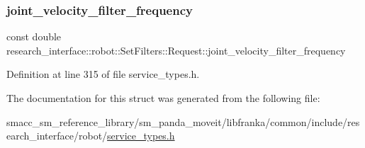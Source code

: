 \mbox{\label{structresearch__interface_1_1robot_1_1SetFilters_1_1Request_a5da8f47649157c38440941e8a55eb263}} 
\subsubsection{\texorpdfstring{joint\+\_\+velocity\+\_\+filter\+\_\+frequency}{joint\_velocity\_filter\_frequency}}
{\footnotesize\ttfamily const double research\+\_\+interface\+::robot\+::\+Set\+Filters\+::\+Request\+::joint\+\_\+velocity\+\_\+filter\+\_\+frequency}



Definition at line 315 of file service\+\_\+types.\+h.



The documentation for this struct was generated from the following file\+:\begin{DoxyCompactItemize}
\item 
smacc\+\_\+sm\+\_\+reference\+\_\+library/sm\+\_\+panda\+\_\+moveit/libfranka/common/include/research\+\_\+interface/robot/\hyperlink{service__types_8h}{service\+\_\+types.\+h}\end{DoxyCompactItemize}
